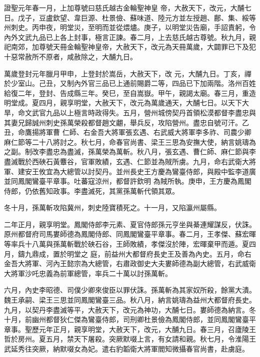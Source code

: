 \begin{pinyinscope}
 證聖元年春一月，上加尊號曰慈氏越古金輪聖神皇
 帝，大赦天下，改元，大酺七日。戊子，豆盧欽望、韋巨源、杜景儉、蘇味道、陸元方並左授趙、鄜、集、綏等州刺史。丙申夜，明堂災，至明而並從煨燼。庚子，以明堂災告廟，手詔責躬，令內外文武九品已上各上封事，極言正諫。春二月，上去慈氏越古尊號。秋九月，親祀南郊，加尊號天冊金輪聖神皇帝，大赦天下，改元為天冊萬歲，大闢罪已下及犯十惡常赦所不原者，咸赦除之，大酺九日。



 萬歲登封元年臘月甲申，上登封於嵩岳，大赦天下，改
 元，大酺九日。丁亥，禪於少室山。己丑，又制內外官三品已上通前賜爵二等，四品已下加兩階。洛州百姓給復二年，登封、告成縣三年。癸巳，至自嵩嶽。甲午，親謁太廟。春三月，重造明堂成。夏四月，親享明堂，大赦天下，改元為萬歲通天，大酺七日。以天下大旱，命文武官九品以上極言時政得失。五月，營州城傍契丹首領松漠都督李盡忠與其妻兄歸誠州刺史孫萬榮殺都督趙文翽，舉兵反，攻陷營州。盡忠自號可汗。乙丑，命鷹揚將軍曹
 仁師、右金吾大將軍張玄遇、右武威大將軍李多祚、司農少卿麻仁節等二十八將討之。秋七月，命春官尚書、梁王三思為安撫大使，納言姚璹為之副。制改李盡忠為盡滅，孫萬榮為萬斬。秋八月，張玄遇、曹仁師、麻仁節與李盡滅戰於西硤石黃麞谷，官軍敗績，玄遇、仁節並為賊所虜。九月，命右武衛大將軍、建安王攸宜為大總管以討契丹。並州長史王方慶為鸞臺侍郎，與殿中監李道廣並同鳳閣鸞臺平章事。吐蕃寇涼州，都督許欽明
 為賊所執。庚申，王方慶為鳳閣侍郎，仍依舊知政事。李盡滅死，其黨孫萬斬代領其眾。



 冬十月，孫萬斬攻陷冀州，刺史陸寶積死之。十一月，又陷瀛州屬縣。



 二年正月，親享明堂。鳳閣侍郎李元素、夏官侍郎孫元亨坐與綦連耀謀反，伏誅。原州都督府司馬婁師德為鳳閣侍郎、同鳳閣鸞臺平章事。春二月，王孝傑、蘇宏暉等率兵十八萬與孫萬斬戰於硤石谷，王師敗績，孝傑沒於陣，宏暉棄甲而遁。夏四月，鑄九鼎成，置於明堂之
 庭，前益州大都督府長史王及善為內史。五月，命右金吾大將軍、河內王懿宗為大總管，右肅政御史大夫婁師德為副大總管，右武威衛大將軍沙吒忠義為前軍總管，率兵二十萬以討孫萬斬。



 六月，內史李昭德、司僕少卿來俊臣以罪伏誅。孫萬斬為其家奴所殺，餘黨大潰。魏王承嗣、梁王三思並同鳳閣鸞臺三品。秋八月，納言姚璹為益州大都督府長史。九月，以契丹李盡滅等平，大赦天下，改元為神功，大酺七日。婁師德為納言。冬
 十月，前幽州都督狄仁傑為鸞臺侍郎，司刑卿杜景儉為鳳閣侍郎，並同鳳閣鸞臺平章事。聖歷元年正月，親享明堂，大赦天下，改元，大酺九日。春三月，召廬陵王哲於房州。夏五月，禁天下屠殺。突厥默啜上言，有女請和親。秋七月，令淮陽王武延秀往突厥，納默啜女為妃。遣右豹韜衛大將軍閻知微攝春官尚書，赴虜庭。




\end{pinyinscope}
